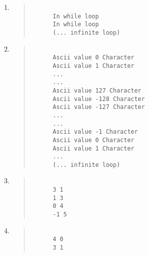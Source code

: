 \documentclass{report}
\begin{document}
\begin{enumerate}
  \item \begin{quote}
  \begin{verbatim}
      
      In while loop
      In while loop
      (... infinite loop)
  \end{verbatim}
  \end{quote}

  \item \begin{quote}
  \begin{verbatim}
      
      Ascii value 0 Character 
      Ascii value 1 Character 
      ...
      ...
      Ascii value 127 Character 
      Ascii value -128 Character 
      Ascii value -127 Character 
      ...
      ...
      Ascii value -1 Character 
      Ascii value 0 Character 
      Ascii value 1 Character 
      ...
      (... infinite loop)
  \end{verbatim}
  \end{quote}

  \item \begin{quote}
  \begin{verbatim}
      
      3 1
      1 3
      0 4
      -1 5
  \end{verbatim}
  \end{quote}

  \item \begin{quote}
  \begin{verbatim}
      
      4 0
      3 1
  \end{verbatim}
  \end{quote}
\end{enumerate}
\end{document}
